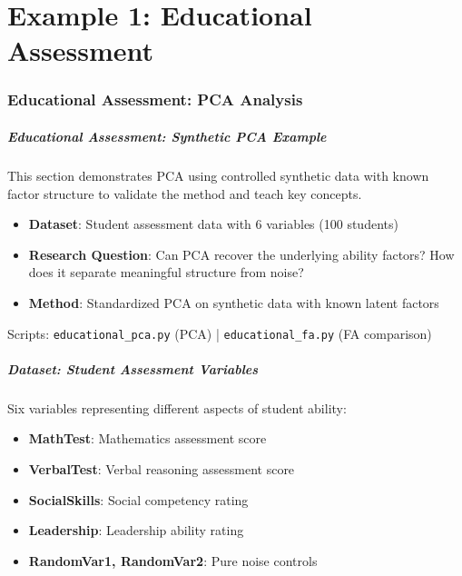\documentclass[aspectratio=169]{beamer}
\begin{document}

\part{Example 1: Educational Assessment}

\begin{frame}
    \partpage
\end{frame}

\section{Educational Assessment: PCA Analysis}

\begin{frame}
    \frametitle{Educational Assessment: Synthetic PCA Example}
    This section demonstrates PCA using controlled synthetic data with known factor structure to validate the method and teach key concepts.
    \begin{itemize}
        \item \textbf{Dataset}: Student assessment data with 6 variables (100 students) \pause
        \item \textbf{Research Question}: Can PCA recover the underlying ability factors? How does it separate meaningful structure from noise? \pause
        \item \textbf{Method}: Standardized PCA on synthetic data with known latent factors \pause
    \end{itemize}
    \vspace{6pt}
    Scripts: \texttt{educational\_pca.py} (PCA) | \texttt{educational\_fa.py} (FA comparison)
\end{frame}

\begin{frame}
    \frametitle{Dataset: Student Assessment Variables}
    Six variables representing different aspects of student ability:
    \begin{itemize}
        \item \textbf{MathTest}: Mathematics assessment score \pause
        \item \textbf{VerbalTest}: Verbal reasoning assessment score \pause
        \item \textbf{SocialSkills}: Social competency rating \pause
        \item \textbf{Leadership}: Leadership ability rating \pause
        \item \textbf{RandomVar1, RandomVar2}: Pure noise controls \pause
    \end{itemize}
\end{frame}
\end{document}
